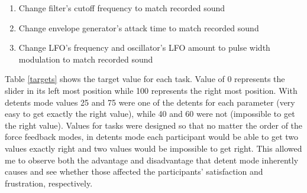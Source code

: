 \begin{enumerate}
	\item Change filter's cutoff frequency to match recorded sound
	\item Change envelope generator's attack time to match recorded sound
	\item Change LFO's frequency and oscillator's LFO amount to pulse width modulation to match recorded sound
\end{enumerate}

Table \ref{targets} shows the target value for each task. Value of 0 represents the slider in its left most position while 100 represents the right most position. With detents mode values 25 and 75 were one of the detents for each parameter (very easy to get exactly the right value), while 40 and 60 were not (impossible to get the right value). Values for tasks were designed so that no matter the order of the force feedback modes, in detents mode each participant would be able to get two values exactly right and two values would be impossible to get right. This allowed me to observe both the advantage and disadvantage that detent mode inherently causes and see whether those affected the participants' satisfaction and frustration, respectively.

